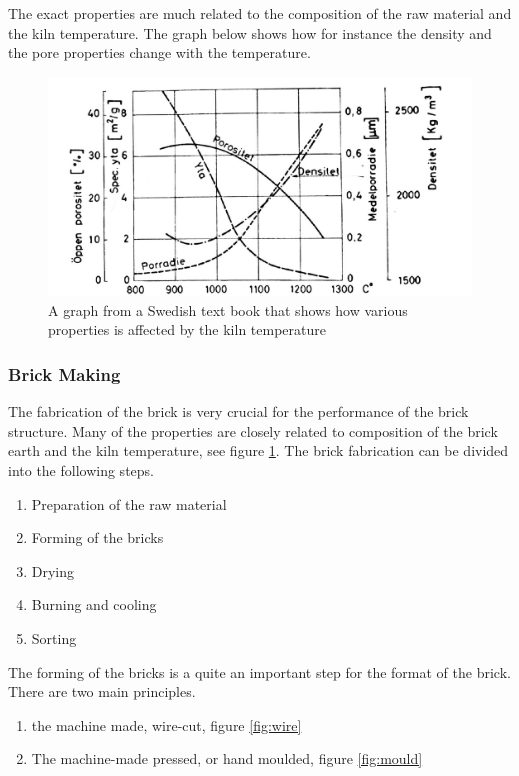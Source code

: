 The exact properties are much related to the composition of the raw material and the kiln temperature. The graph below shows how for instance the density and the pore properties change with the temperature.

\begin{figure}[H]
\centering
\includegraphics[width=0.9\linewidth ]{figure/Introduction/brickProp3.pdf}
\caption{A graph from a Swedish text book \cite{ref:byggmaterial} that shows how various properties is affected by the kiln temperature}
\label{fig:brickProp}
\end{figure}



\subsubsection{Brick Making}

The fabrication of the brick is very crucial for the performance of the brick structure. Many of the properties are closely related to composition of the brick earth \cite{ref:Mitchell} and the kiln temperature, see figure \ref{fig:brickProp}.
The brick fabrication can be divided into the following steps.\cite{ref:byggmaterial} 

\begin{enumerate}
    \item Preparation of the raw material
    \item Forming of the bricks
    \item Drying
    \item Burning and cooling
    \item Sorting
\end{enumerate}

The forming of the bricks is a quite an important step for the format of the brick. There are two main principles.

\begin{enumerate}
    \item the machine made, wire-cut, figure \ref{fig:wire}
    \item The machine-made pressed, or hand moulded, figure \ref{fig:mould}
\end{enumerate}

